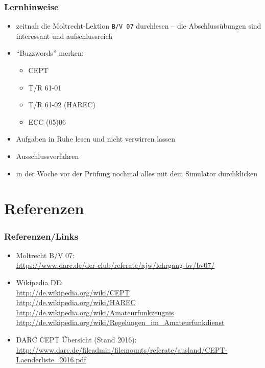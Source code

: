 \begin{frame}
  \frametitle{Lernhinweise}

  \begin{itemize}
    \item zeitnah die Moltrecht-Lektion \texttt{B/V 07} durchlesen -- die
      Abschlussübungen sind interessant und aufschlussreich
    \item ``Buzzwords'' merken:
      \begin{itemize}
        \item CEPT
        \item T/R 61-01
        \item T/R 61-02 (HAREC)
        \item ECC (05)06
      \end{itemize}
    \item Aufgaben in Ruhe lesen und nicht verwirren lassen
    \item Ausschlussverfahren
    \item in der Woche vor der Prüfung nochmal alles mit dem Simulator durchklicken
  \end{itemize}

\end{frame}

\section{Referenzen}

\begin{frame}
  \frametitle{Referenzen/Links}

  \footnotesize
  \begin{itemize}
    \item Moltrecht B/V 07: \\
      \url{https://www.darc.de/der-club/referate/ajw/lehrgang-bv/bv07/}
    \item Wikipedia DE: \\
      \url{http://de.wikipedia.org/wiki/CEPT} \\
      \url{http://de.wikipedia.org/wiki/HAREC} \\
      \url{http://de.wikipedia.org/wiki/Amateurfunkzeugnis} \\
      \url{http://de.wikipedia.org/wiki/Regelungen_im_Amateurfunkdienst} \\
    \item DARC CEPT Übersicht (Stand 2016): \\
      \url{http://www.darc.de/fileadmin/filemounts/referate/ausland/CEPT-Laenderliste_2016.pdf}
  \end{itemize}

\end{frame}


